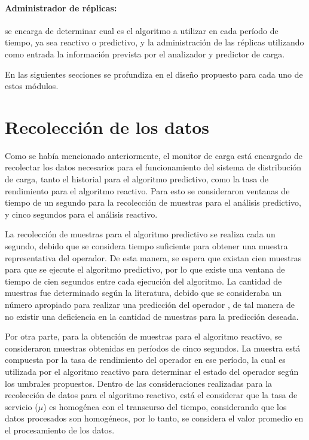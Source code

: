 \paragraph{Administrador de réplicas:} se encarga de determinar cual es el algoritmo a utilizar en cada período de tiempo, ya sea reactivo o predictivo, y la administración de las réplicas utilizando como entrada la información prevista por el analizador y predictor de carga.

En las siguientes secciones se profundiza en el diseño propuesto para cada uno de estos módulos.

\section{Recolección de los datos}

Como se había mencionado anteriormente, el monitor de carga está encargado de recolectar los datos necesarios para el funcionamiento del sistema de distribución de carga, tanto el historial para el algoritmo predictivo, como la tasa de rendimiento para el algoritmo reactivo. Para esto se consideraron ventanas de tiempo de un segundo para la recolección de muestras para el análisis predictivo, y cinco segundos para el análisis reactivo.

La recolección de muestras para el algoritmo predictivo se realiza cada un segundo, debido que se considera tiempo suficiente para obtener una muestra representativa del operador. De esta manera, se espera que existan cien muestras para que se ejecute el algoritmo predictivo, por lo que existe una ventana de tiempo de cien segundos entre cada ejecución del algoritmo. La cantidad de muestras fue determinado según la literatura, debido que se consideraba un número apropiado para realizar una predicción del operador \citep{ching2006markov}, de tal manera de no existir una deficiencia en la cantidad de muestras para la predicción deseada.

Por otra parte, para la obtención de muestras para el algoritmo reactivo, se consideraron muestras obtenidas en períodos de cinco segundos. La muestra está compuesta por la tasa de rendimiento del operador en ese período, la cual es utilizada por el algoritmo reactivo para determinar el estado del operador según los umbrales propuestos. Dentro de las consideraciones realizadas para la recolección de datos para el algoritmo reactivo, está el considerar que la tasa de servicio ($\mu$) es homogénea con el transcurso del tiempo, considerando que los datos procesados son homogéneos, por lo tanto, se considera el valor promedio en el procesamiento de los datos. 

